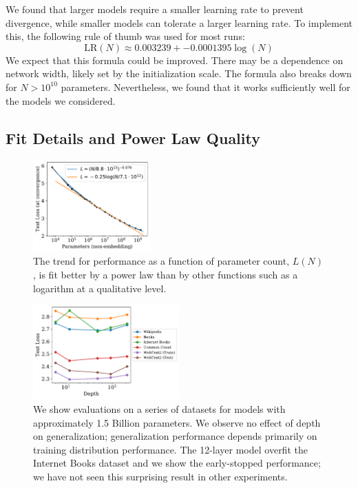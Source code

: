 \documentclass[english]{article}
\begin{document}
We found that larger models require a smaller learning rate to prevent divergence, while smaller models can tolerate a larger learning rate.  To implement this, the following rule of thumb was used for most runs:
\begin{equation}
\mathrm{LR}(N) \approx 0.003239 + -0.0001395  \log(N)
\end{equation}
We expect that this formula could be improved.  There may be a dependence on network width, likely set by the initialization scale.  The formula also breaks down for $N>10^{10}$ parameters.  Nevertheless, we found that it works sufficiently well for the models we considered.


\subsection{Fit Details and Power Law Quality}

\begin{figure}
\noindent \centering{} 
\includegraphics[width=0.40\textwidth]{PoorLogFit}
\caption[Comparison of Power-Law and Logarithmic Fits]{The trend for performance as a function of parameter count, $L(N)$, is fit better by a power law than by other functions such as a logarithm at a qualitative level.  \label{fig:PoorLogFit}}
\end{figure}

\begin{figure}
\noindent \centering{}
\includegraphics[width=0.5\textwidth]{DepthVsGeneralization}
\caption[Generalization versus depth]{We show evaluations on a series of datasets for models with approximately 1.5 Billion parameters.  We observe no effect of depth on generalization; generalization performance depends primarily on training distribution performance. The 12-layer model overfit the Internet Books dataset and we show the early-stopped performance; we have not seen this surprising result in other experiments. \label{fig:DepthVsGeneralization}}
\end{figure}
\end{document}

